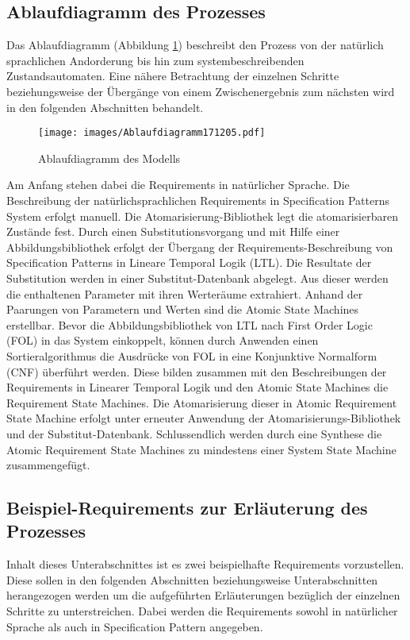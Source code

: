 \subsection{Ablaufdiagramm des Prozesses}
\label{subsec:Flowchart_Model}
Das Ablaufdiagramm (Abbildung \ref{img:Flowchart_Model}) beschreibt den Prozess von der natürlich sprachlichen Andorderung bis hin zum systembeschreibenden Zustandsautomaten. Eine nähere Betrachtung der einzelnen Schritte beziehungsweise der Übergänge von einem Zwischenergebnis zum nächsten wird in den folgenden Abschnitten behandelt.\\
\begin{figure}
	\centering
	\texttt{[image: images/Ablaufdiagramm171205.pdf]}
	\caption{Ablaufdiagramm des Modells}
	\label{img:Flowchart_Model}
\end{figure}
Am Anfang stehen dabei die Requirements in natürlicher Sprache. Die Beschreibung der natürlichsprachlichen Requirements in Specification Patterns System erfolgt manuell. Die Atomarisierung-Bibliothek legt die atomarisierbaren Zustände fest. Durch einen Substitutionsvorgang und mit Hilfe einer Abbildungsbibliothek erfolgt der Übergang der Requirements-Beschreibung von Specification Patterns in Lineare Temporal Logik (LTL). Die Resultate der Substitution werden in einer Substitut-Datenbank abgelegt. Aus dieser werden die enthaltenen Parameter mit ihren Werteräume extrahiert. Anhand der Paarungen von Parametern und Werten sind die Atomic State Machines erstellbar. Bevor die Abbildungsbibliothek von LTL nach First Order Logic (FOL) in das System einkoppelt, können durch Anwenden einen Sortieralgorithmus die Ausdrücke von FOL in eine Konjunktive Normalform (CNF) überführt werden. Diese bilden zusammen mit den Beschreibungen der Requirements in Linearer Temporal Logik und den Atomic State Machines die Requirement State Machines. Die Atomarisierung dieser in Atomic Requirement State Machine erfolgt unter erneuter Anwendung der Atomarisierungs-Bibliothek und der Substitut-Datenbank. Schlussendlich werden durch eine Synthese die Atomic Requirement State Machines zu mindestens einer System State Machine zusammengefügt.
\subsection{Beispiel-Requirements zur Erläuterung des Prozesses}
\label{subsec:ex_exp_proc}
Inhalt dieses Unterabschnittes ist es zwei beispielhafte Requirements vorzustellen. Diese sollen in den folgenden Abschnitten beziehungsweise Unterabschnitten herangezogen werden um die aufgeführten Erläuterungen bezüglich der einzelnen Schritte zu unterstreichen. Dabei werden die Requirements sowohl in natürlicher Sprache als auch in Specification Pattern angegeben.
